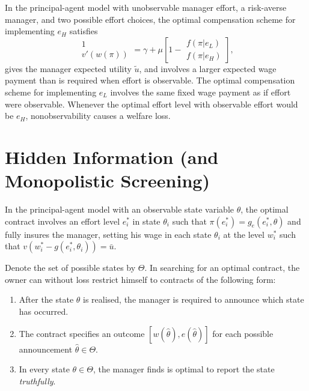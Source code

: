 \begin{prop}
    In the principal-agent model with unobservable manager effort, a risk-averse manager, and two possible effort choices, the optimal compensation scheme for implementing $e_H$ satisfies
    \begin{equation*}
        \begin{matrix}
            1 \\
            v'\left(w(\pi)\right)
        \end{matrix}
        = \gamma + \mu
        \left[1 - \begin{matrix}
            f(\pi | e_L) \\
            f(\pi | e_H)
        \end{matrix}\right],
    \end{equation*}
    gives the manager expected utility $\tilde{u}$, and involves a larger expected wage payment than is required when effort is observable. The optimal compensation scheme for implementing $e_L$ involves the same fixed wage payment as if effort were observable. Whenever the optimal effort level with observable effort would be $e_H$, nonobservability causes a welfare loss.
\end{prop}


\section{Hidden Information (and Monopolistic Screening)}

\begin{prop}
    In the principal-agent model with an observable state variable $\theta$, the optimal contract involves an effort level $e^*_i$ in state $\theta_i$ such that $\pi(e^*_i) = g_e(e^*_i, \theta)$ and fully insures the manager, setting his wage in each state $\theta_i$ at the level $w^*_i$ such that $v\left(w^*_i - g(e^*_i, \theta_i)\right) = \bar{u}$.   
\end{prop}

\begin{prop}
    Denote the set of possible states by $\Theta$. In searching for an optimal contract, the owner can without loss restrict himself to contracts of the following form:
    \begin{enumerate}
        \item After the state $\theta$ is realised, the manager is required to announce which state has occurred.
        \item The contract specifies an outcome $[w(\hat{\theta}), e(\hat{\theta})]$ for each possible announcement $\hat{\theta} \in \Theta$.
        \item In every state $\theta \in \Theta$, the manager finds is optimal to report the state \emph{truthfully}.
    \end{enumerate}
\end{prop}

